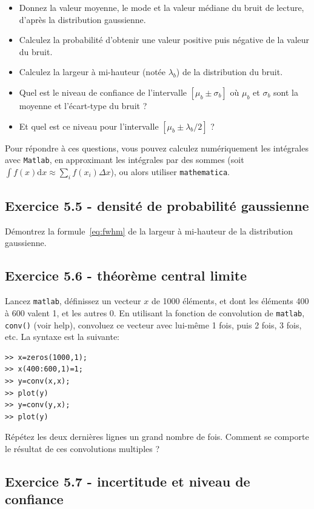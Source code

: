 \documentclass[main.tex]{subfiles}
\begin{document}
\begin{itemize}
    \item Donnez la valeur moyenne, le mode et la valeur médiane du bruit de lecture, d'après la distribution gaussienne.
    \item Calculez la probabilité d'obtenir une valeur positive puis négative de la valeur du bruit.
    \item Calculez la largeur à mi-hauteur (notée $\lambda_b$) de la distribution du bruit.
    \item Quel est le niveau de confiance de l'intervalle $[\mu_b\pm\sigma_b]$ où $\mu_b$ et $\sigma_b$ sont la moyenne et l'écart-type du bruit ?
    \item Et quel est ce niveau pour l'intervalle $[\mu_b\pm\lambda_b/2]$ ?
\end{itemize}
Pour répondre à ces questions, vous pouvez calculez numériquement les intégrales avec \texttt{Matlab}, en approximant les intégrales par des sommes (soit $\int f(x)\text{d}x\approx\sum_if(x_i)\Delta x$), ou alors utiliser \texttt{mathematica}.

\subsection*{Exercice 5.5 - densité de probabilité gaussienne}

Démontrez la formule~\ref{eq:fwhm} de la largeur à mi-hauteur de la distribution gaussienne.

\subsection*{Exercice 5.6 - théorème central limite}

Lancez \texttt{matlab}, définissez un vecteur $x$ de 1000 éléments, et dont les éléments 400 à 600 valent 1, et les autres 0. En utilisant la fonction de convolution de \texttt{matlab}, \texttt{conv()} (voir help), convoluez ce vecteur avec lui-même 1 fois, puis 2 fois, 3 fois, etc. La syntaxe est la suivante:
\begin{verbatim}
>> x=zeros(1000,1);
>> x(400:600,1)=1;
>> y=conv(x,x);
>> plot(y)
>> y=conv(y,x);
>> plot(y)
\end{verbatim}
Répétez les deux dernières lignes un grand nombre de fois. Comment se comporte le résultat de ces convolutions multiples ?

\newpage
\subsection*{Exercice 5.7 - incertitude et niveau de confiance}
\end{document}
